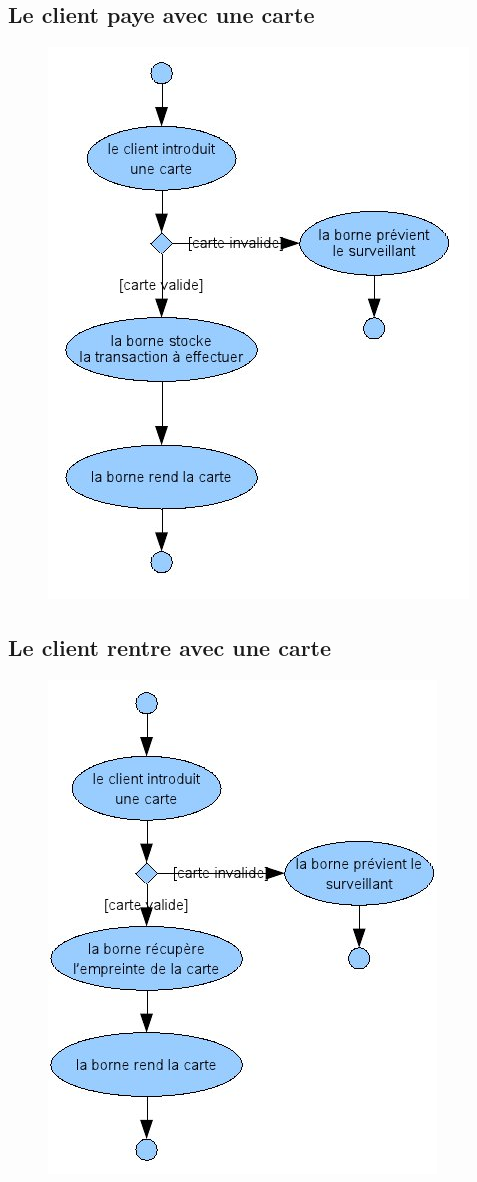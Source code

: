 \documentclass[a4paper]{article}
\begin{document}
\subsection{Le client paye avec une carte}
\begin{figure}[!ht]
\centering
\includegraphics[scale=.5]{imgs/act_cartepayer.jpg}
\end{figure}
\newpage
\subsection{Le client rentre avec une carte}
\begin{figure}[!ht]
\centering
\includegraphics[scale=.5]{imgs/act_carterentrer.jpg}
\end{figure}
\newpage
\end{document}
